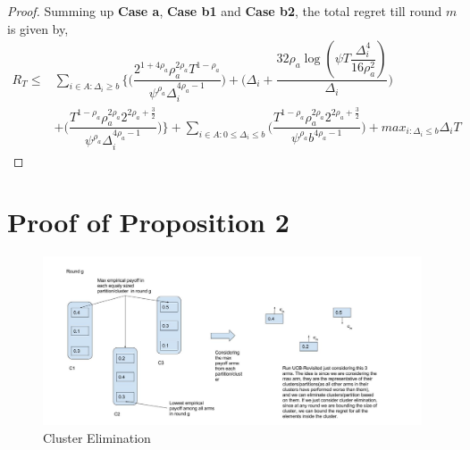 \begin{proof}
% 
 

 

% 
 
 
Summing up \textbf{Case a}, \textbf{Case b1} and \textbf{Case b2}, the total regret till round $m$ is given by,
\begin{align*}
 R_{T} \leq &\sum\limits_{i\in A:\Delta_{i}\geq b}\bigg\lbrace\bigg(\dfrac{2^{1+4\rho_{a}}\rho_{a}^{2\rho_{a}}T^{1-\rho_{a}}}{\psi^{\rho_{a}}\Delta_{i}^{4\rho_{a}-1}}\bigg) + \bigg(\Delta_{i}+\dfrac{32\rho_{a}\log{(\psi  T\dfrac{\Delta_{i}^{4}}{16\rho_{a}^{2}})}}{\Delta_{i}}\bigg)\\
&  +  \bigg(\dfrac{T^{1-\rho_{a}}\rho_{a}^{2\rho_{a}}2^{2\rho_{a}+\frac{3}{2}}}{\psi^{\rho_{a}}\Delta_{i}^{4\rho_{a} -1}} \bigg) \bigg \rbrace+\sum\limits_{i\in A:0\leq\Delta_{i}\leq b}\bigg(\dfrac{T^{1-\rho_{a}}\rho_{a}^{2\rho_{a}}2^{2\rho_{a}+\frac{3}{2}}}{\psi^{\rho_{a}}b^{4\rho_{a} -1}} \bigg) + max_{i:\Delta_{i}\leq b}\Delta_{i}T
\end{align*}
  
\end{proof}

\section{Proof of Proposition 2}
\label{App:B}

\begin{figure}
\includegraphics[scale=0.3]{img/diagCluster.jpg}
\caption{Cluster Elimination}
\label{Fig:ClusFig}
\end{figure}

